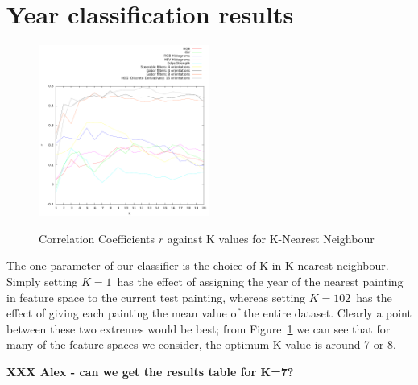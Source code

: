 \documentclass[conference,a4paper]{IEEEtran}
\begin{document}
\section{Year classification results}
\label{results}

\begin{figure}[h]
\centering
\includegraphics[width=0.5\textwidth]{results/mean.pdf}
\label{pearsons-k}
%
\caption{Correlation Coefficients $r$ against K values for K-Nearest Neighbour}
\end{figure}


The one parameter of our classifier is the choice of K in K-nearest neighbour.
Simply setting $K=1$\ has the effect of assigning the year of the nearest
painting in feature space to the current test painting, whereas setting
$K=102$\ has the effect of giving each painting the mean value of the entire
dataset. Clearly a point between these two extremes would be best; from
Figure~\ref{pearsons-k} we can see that for many of the feature spaces we
consider, the optimum K value is around 7 or 8.

\textbf{XXX Alex - can we get the results table for K=7?}
\end{document}
